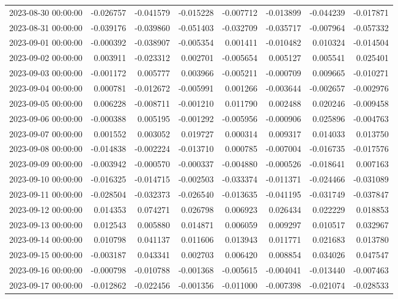 \begin{tabular}{lrrrrrrr}
2023-08-30 00:00:00 & -0.026757 & -0.041579 & -0.015228 & -0.007712 & -0.013899 & -0.044239 & -0.017871 \\
2023-08-31 00:00:00 & -0.039176 & -0.039860 & -0.051403 & -0.032709 & -0.035717 & -0.007964 & -0.057332 \\
2023-09-01 00:00:00 & -0.000392 & -0.038907 & -0.005354 & 0.001411 & -0.010482 & 0.010324 & -0.014504 \\
2023-09-02 00:00:00 & 0.003911 & -0.023312 & 0.002701 & -0.005654 & 0.005127 & 0.005541 & 0.025401 \\
2023-09-03 00:00:00 & -0.001172 & 0.005777 & 0.003966 & -0.005211 & -0.000709 & 0.009665 & -0.010271 \\
2023-09-04 00:00:00 & 0.000781 & -0.012672 & -0.005991 & 0.001266 & -0.003644 & -0.002657 & -0.002976 \\
2023-09-05 00:00:00 & 0.006228 & -0.008711 & -0.001210 & 0.011790 & 0.002488 & 0.020246 & -0.009458 \\
2023-09-06 00:00:00 & -0.000388 & 0.005195 & -0.001292 & -0.005956 & -0.000906 & 0.025896 & -0.004763 \\
2023-09-07 00:00:00 & 0.001552 & 0.003052 & 0.019727 & 0.000314 & 0.009317 & 0.014033 & 0.013750 \\
2023-09-08 00:00:00 & -0.014838 & -0.002224 & -0.013710 & 0.000785 & -0.007004 & -0.016735 & -0.017576 \\
2023-09-09 00:00:00 & -0.003942 & -0.000570 & -0.000337 & -0.004880 & -0.000526 & -0.018641 & 0.007163 \\
2023-09-10 00:00:00 & -0.016325 & -0.014715 & -0.002503 & -0.033374 & -0.011371 & -0.024466 & -0.031089 \\
2023-09-11 00:00:00 & -0.028504 & -0.032373 & -0.026540 & -0.013635 & -0.041195 & -0.031749 & -0.037847 \\
2023-09-12 00:00:00 & 0.014353 & 0.074271 & 0.026798 & 0.006923 & 0.026434 & 0.022229 & 0.018853 \\
2023-09-13 00:00:00 & 0.012543 & 0.005880 & 0.014871 & 0.006059 & 0.009297 & 0.010517 & 0.032967 \\
2023-09-14 00:00:00 & 0.010798 & 0.041137 & 0.011606 & 0.013943 & 0.011771 & 0.021683 & 0.013780 \\
2023-09-15 00:00:00 & -0.003187 & 0.043341 & 0.002703 & 0.006420 & 0.008854 & 0.034026 & 0.047547 \\
2023-09-16 00:00:00 & -0.000798 & -0.010788 & -0.001368 & -0.005615 & -0.004041 & -0.013440 & -0.007463 \\
2023-09-17 00:00:00 & -0.012862 & -0.022456 & -0.001356 & -0.011000 & -0.007398 & -0.021074 & -0.028533 \\

\end{tabular}
